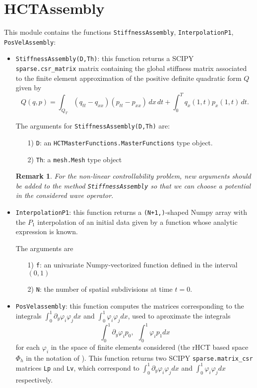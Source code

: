 \documentclass{amsart}
\theoremstyle{plain}
\newtheorem{remark}{Remark}
\theoremstyle{definition}
\theoremstyle{remark}
\numberwithin{equation}{section}
\begin{document}
\section{HCTAssembly}

This module contains the functions \verb|StiffnessAssembly|, \verb|InterpolationP1|, \verb|PosVelAssembly|:


\begin{itemize}
\item \verb|StiffnessAssembly(D,Th)|:  this function returns a SCIPY \verb|sparse.csr_matrix| matrix containing the global stiffness matrix associated to the finite element approximation of the positive definite quadratic form $Q$ given by
$$Q(q,p)=\int_{Q_T}(q_{tt}-q_{xx})(p_{tt}-p_{xx})\,dx\,dt+\int_0^Tq_x(1,t)p_x(1,t)\,dt. $$

The arguments for \verb|StiffnessAssembly(D,Th)| are:
\begin{itemize}
\item[1)] \verb|D|: an \verb|HCTMasterFunctions.MasterFunctions| type object.
\item[2)] \verb|Th|: a \verb|mesh.Mesh| type object
\end{itemize}

\begin{remark}
For the non-linear controllability problem, new arguments should be added to 
the method \verb|StiffnessAssembly| so that we can choose a potential in the considered wave
operator.
\end{remark}

\item \verb|InterpolationP1|: this function returns a \verb|(N+1,)|-shaped Numpy array with the $P_1$ interpolation of an initial data given by a 
function whose analytic expression is known.

The arguments are
\begin{itemize}
\item[1)] \verb|f|: an univariate  Numpy-vectorized function defined in the interval $(0,1)$ 
\item[2)] \verb|N|: the number of spatial subdivisions at time $t=0$.

\end{itemize}


\item \verb|PosVelassembly|: this function computes the matrices corresponding to the integrals
$\int_0^1 \partial_y\varphi_i \varphi_jdx$ and $\int_0^1 \varphi_i \varphi_jdx$, used to aproximate
the integrals
$$\int_0^1 \partial_y\varphi_i p_0,\ \ \int_0^1 \varphi_i p_1dx$$
for each $\varphi_i$ in the space of finite elements considered (the rHCT based space $\Phi_h$ in the notation of \cite{CindeaMunch}). This function returns two SCIPY \verb|sparse.matrix_csr| matrices \verb|Lp| and \verb|Lv|, which correspond to $\int_0^1 \partial_y\varphi_i \varphi_jdx$ and $\int_0^1 \varphi_i \varphi_jdx$ respectively.
\end{itemize}
\end{document}
